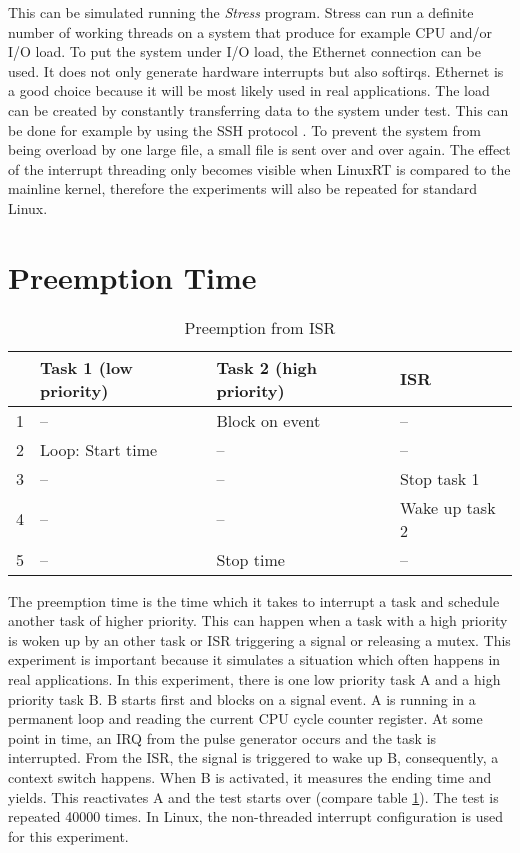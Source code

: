 This can be simulated running the \textit{Stress} \cite{stress} program.
Stress can run a definite number of working threads on a system that produce for example \ac{CPU} and/or \ac{I/O} load.
To put the system under \ac{I/O} load, the Ethernet connection can be used.
It does not only generate hardware interrupts but also softirqs.
Ethernet is a good choice because it will be most likely used in real applications.
The load can be created by constantly transferring data to the system under test.
This can be done for example by using the \ac{SSH} protocol \cite{tlip:tsspa}.
To prevent the system from being overload by one large file, a small file is sent over and over again. 
The effect of the interrupt threading only becomes visible when LinuxRT is compared to the mainline kernel, therefore the experiments will also be repeated for standard Linux.

\section{Preemption Time}
\begin{table}[htbp]
	\centering
		\begin{tabular}{|l|l|l|l|}
			\hline
				& Task 1 (low priority)& Task 2 (high priority)	& \ac{ISR}				\\
				\hline 
				1 & --									 & Block on event					& --							\\
			  2 & Loop: Start time		 & --											& --							\\
			  3 & --									 & --											& Stop task 1			\\
			  4 & --									 & --							 				& Wake up task 2	\\
			  5 & --									 & Stop time							& --							\\	  
			\hline
		\end{tabular}
	\caption{Preemption from ISR}
	\label{tab_preemption}
\end{table}

The preemption time is the time which it takes to interrupt a task and schedule another task of higher priority.
This can happen when a task with a high priority is woken up by an other task or \ac{ISR} triggering a signal or releasing a mutex.
This experiment is important because it simulates a situation which often happens in real applications.
In this experiment, there is one low priority task A and a high priority task B.
B starts first and blocks on a signal event.
A is running in a permanent loop and reading the current \ac{CPU} cycle counter register.
At some point in time, an \ac{IRQ} from the pulse generator occurs and the task is interrupted.
From the \ac{ISR}, the signal is triggered to wake up B, consequently, a context switch happens.
When B is activated, it measures the ending time and yields.
This reactivates A and the test starts over (compare table \ref{tab_preemption}).
The test is repeated 40000 times.
In Linux, the non-threaded interrupt configuration is used for this experiment. 

